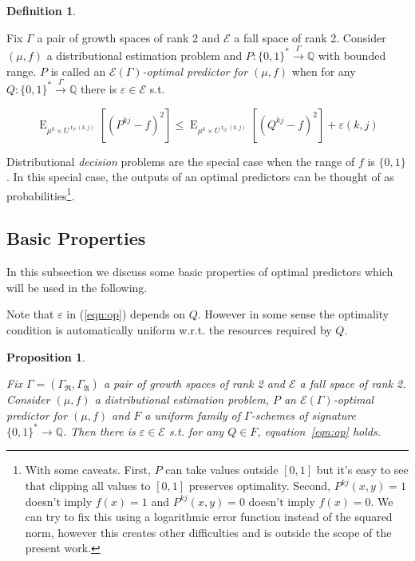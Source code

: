 \documentclass{article}
\theoremstyle{definition}
\newtheorem{definition}{Definition}[section]
\theoremstyle{plain}
\newtheorem{proposition}{Proposition}[section]
\newcommand{\Words}{{\{ 0, 1 \}^*}}
\newcommand{\Bool}{\{0,1\}}
\DeclareMathOperator{\E}{E}
\DeclareMathOperator{\R}{r}
\newcommand{\Rats}{\mathbb{Q}}
\begin{document}
\begin{definition}
\label{def:op}

Fix $\Gamma$ a pair of growth spaces of rank 2 and $\mathcal{E}$ a fall space of rank 2. Consider $(\mu,f)$ a distributional estimation problem and $P: \Words \xrightarrow{\Gamma} \Rats$ with bounded range. $P$ is called an \emph{$\mathcal{E}(\Gamma)$-optimal predictor for $(\mu,f)$} when for any $Q: \Words \xrightarrow{\Gamma} \Rats$ there is $\varepsilon \in \mathcal{E}$ s.t.

\begin{equation}
\label{eqn:op}
\E_{\mu^k \times U^{\R_P(k,j)}}[(P^{kj} - f)^2] \leq \E_{\mu^k \times U^{\R_Q(k,j)}}[(Q^{kj} - f)^2] + \varepsilon(k,j)
\end{equation}

\end{definition}

Distributional \emph{decision} problems are the special case when the range of $f$ is $\Bool$. In this special case, the outputs of an optimal predictors can be thought of as probabilities\footnote{With some caveats. First, $P$ can take values outside $[0,1]$ but it's easy to see that clipping all values to $[0,1]$ preserves optimality. Second, $P^{kj}(x,y)=1$ doesn't imply $f(x) = 1$ and $P^{kj}(x,y)=0$ doesn't imply $f(x)=0$. We can try to fix this using a logarithmic error function instead of the squared norm, however this creates other difficulties and is outside the scope of the present work.}.

\subsection{Basic Properties}

In this subsection we discuss some basic properties of optimal predictors which will be used in the following.

Note that $\varepsilon$ in (\ref{eqn:op}) depends on $Q$. However in some sense the optimality condition is automatically uniform w.r.t. the resources required by $Q$.

\begin{proposition}
\label{prp:unif}

Fix $\Gamma=(\Gamma_{\mathfrak{R}},\Gamma_{\mathfrak{A}})$ a pair of growth spaces of rank 2 and $\mathcal{E}$ a fall space of rank 2. Consider $(\mu,f)$ a distributional estimation problem, $P$ an $\mathcal{E}(\Gamma)$-optimal predictor for $(\mu,f)$ and $F$ a uniform family of $\Gamma$-schemes of signature $\Words \rightarrow \Rats$. Then there is $\varepsilon \in \mathcal{E}$ s.t. for any $Q \in F$, equation~\ref{eqn:op} holds.

\end{proposition}
\end{document}
